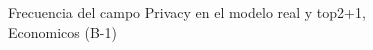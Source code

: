 \begin{figure}[H]
    \centering
    
    \caption{Frecuencia del campo Privacy en el modelo real y top2+1, Economicos (B-1)}
    \label{frecuency-Privacy-top2+1}
\end{figure}